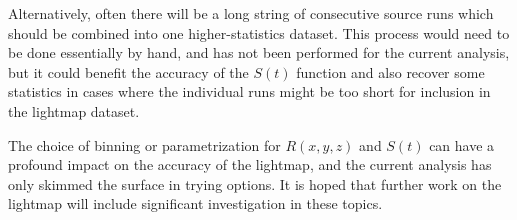Alternatively, often there will be a long string of consecutive source runs which should be combined into one higher-statistics dataset.  This process would need to be done essentially by hand, and has not been performed for the current analysis, but it could benefit the accuracy of the $S(t)$ function and also recover some statistics in cases where the individual runs might be too short for inclusion in the lightmap dataset.

The choice of binning or parametrization for $R(x,y,z)$ and $S(t)$ can have a profound impact on the accuracy of the lightmap, and the current analysis has only skimmed the surface in trying options.  It is hoped that further work on the lightmap will include significant investigation in these topics.













